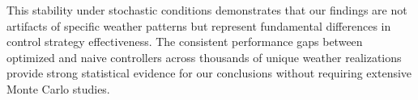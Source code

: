 This stability under stochastic conditions demonstrates that our findings are not artifacts of specific weather patterns but represent fundamental differences in control strategy effectiveness. The consistent performance gaps between optimized and naive controllers across thousands of unique weather realizations provide strong statistical evidence for our conclusions without requiring extensive Monte Carlo studies.